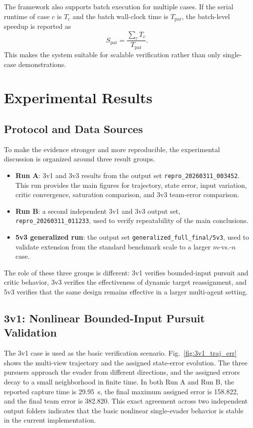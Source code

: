 ﻿\documentclass[conference]{IEEEtran}
\begin{document}
The framework also supports batch execution for multiple cases. If the serial runtime of case $c$ is $T_c$ and the batch wall-clock time is $T_{\text{par}}$, the batch-level speedup is reported as
\begin{equation}
S_{\text{par}}=\frac{\sum_c T_c}{T_{\text{par}}}.
\label{eq:speedup}
\end{equation}
This makes the system suitable for scalable verification rather than only single-case demonstrations.

\section{Experimental Results}
\subsection{Protocol and Data Sources}
To make the evidence stronger and more reproducible, the experimental discussion is organized around three result groups.
\begin{itemize}
    \item \textbf{Run A}: 3v1 and 3v3 results from the output set \texttt{repro\_20260311\_003452}. This run provides the main figures for trajectory, state error, input variation, critic convergence, saturation comparison, and 3v3 team-error comparison.
    \item \textbf{Run B}: a second independent 3v1 and 3v3 output set, \texttt{repro\_20260311\_011233}, used to verify repeatability of the main conclusions.
    \item \textbf{5v3 generalized run}: the output set \texttt{generalized\_full\_final/5v3}, used to validate extension from the standard benchmark scale to a larger $m$-vs.-$n$ case.
\end{itemize}
The role of these three groups is different: 3v1 verifies bounded-input pursuit and critic behavior, 3v3 verifies the effectiveness of dynamic target reassignment, and 5v3 verifies that the same design remains effective in a larger multi-agent setting.

\subsection{3v1: Nonlinear Bounded-Input Pursuit Validation}
The 3v1 case is used as the basic verification scenario. Fig.~\ref{fig:3v1_traj_err} shows the multi-view trajectory and the assigned state-error evolution. The three pursuers approach the evader from different directions, and the assigned errors decay to a small neighborhood in finite time. In both Run A and Run B, the reported capture time is 29.95~s, the final maximum assigned error is 158.822, and the final team error is 382.820. This exact agreement across two independent output folders indicates that the basic nonlinear single-evader behavior is stable in the current implementation.
\end{document}
